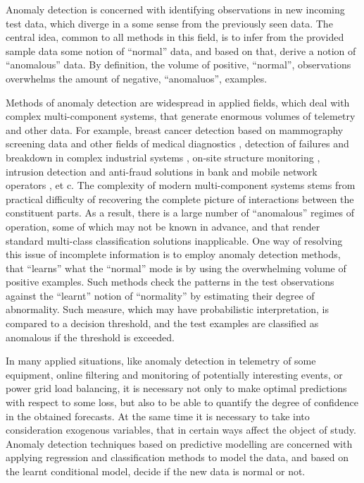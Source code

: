 \documentclass[a4paper,14pt]{extarticle}
\begin{document}
Anomaly detection is concerned with identifying observations in new incoming test
data, which diverge in a some sense from the previously seen data. The central idea,
common to all methods in this field, is to infer from the provided sample data some
notion of ``normal'' data, and based on that, derive a notion of ``anomalous'' data.
By definition, the volume of positive, ``normal'', observations overwhelms the amount
of negative, ``anomaluos'', examples.

Methods of anomaly detection are widespread in applied fields, which deal with complex
multi-component systems, that generate enormous volumes of telemetry and other data.
For example, breast cancer detection based on mammography screening data \cite{tarassenko1995}
and other fields of medical diagnostics \cite{quinn2007,clifton2011}, detection of
failures and breakdown in complex industrial systems \cite{tarassenko2009}, on-site
structure monitoring \cite{surace2010}, intrusion detection and anti-fraud solutions
in bank and mobile network operators \cite{patcha2007,jyothsna2011}, et c. The complexity
of modern multi-component systems stems from practical difficulty of recovering the
complete picture of interactions between the constituent parts. As a result, there
is a large number of ``anomalous'' regimes of operation, some of which may not be
known in advance, and that render standard multi-class classification solutions inapplicable.
One way of resolving this issue of incomplete information is to employ anomaly detection
methods, that ``learns'' what the ``normal'' mode is by using the overwhelming volume
of positive examples. Such methods check the patterns in the test observations against
the ``learnt'' notion of ``normality'' by estimating their degree of abnormality.
Such measure, which may have probabilistic interpretation, is compared to a decision
threshold, and the test examples are classified as anomalous if the threshold is
exceeded.

In many applied situations, like anomaly detection in telemetry of some equipment,
online filtering and monitoring of potentially interesting events, or power grid
load balancing, it is necessary not only to make optimal predictions with respect
to some loss, but also to be able to quantify the degree of confidence in the obtained
forecasts. At the same time it is necessary to take into consideration exogenous
variables, that in certain ways affect the object of study. Anomaly detection techniques
based on predictive modelling are concerned with applying regression and classification
methods to model the data, and based on the learnt conditional model, decide if the
new data is normal or not.
\end{document}
